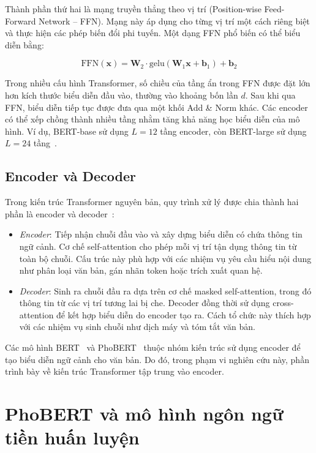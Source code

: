 Thành phần thứ hai là mạng truyền thẳng theo vị trí (Position-wise Feed-Forward Network -- FFN). Mạng này áp dụng cho từng vị trí một cách riêng biệt và thực hiện các phép biến đổi phi tuyến. Một dạng FFN phổ biến có thể biểu diễn bằng:

\[
    \mathrm{FFN}(\mathbf{x})
    =
    \mathbf{W}_2 \cdot
    \mathrm{gelu}(\mathbf{W}_1\mathbf{x}+\mathbf{b}_1)
    +\mathbf{b}_2
\]

Trong nhiều cấu hình Transformer, số chiều của tầng ẩn trong FFN được đặt lớn hơn kích thước biểu diễn đầu vào, thường vào khoảng bốn lần $d$. Sau khi qua FFN, biểu diễn tiếp tục được đưa qua một khối Add \& Norm khác. Các encoder có thể xếp chồng thành nhiều tầng nhằm tăng khả năng học biểu diễn của mô hình. Ví dụ, BERT-base sử dụng $L=12$ tầng encoder, còn BERT-large sử dụng $L=24$ tầng~\cite{devlin2019bert}.

\subsection{Encoder và Decoder}

Trong kiến trúc Transformer nguyên bản, quy trình xử lý được chia thành hai phần là encoder và decoder~\cite{vaswani2017attention}:

\begin{itemize}[leftmargin=2em]

    \item \textit{Encoder}: Tiếp nhận chuỗi đầu vào và xây dựng biểu diễn có chứa thông tin ngữ cảnh. Cơ chế self-attention cho phép mỗi vị trí tận dụng thông tin từ toàn bộ chuỗi. Cấu trúc này phù hợp với các nhiệm vụ yêu cầu hiểu nội dung như phân loại văn bản, gán nhãn token hoặc trích xuất quan hệ.

    \item \textit{Decoder}: Sinh ra chuỗi đầu ra dựa trên cơ chế masked self-attention, trong đó thông tin từ các vị trí tương lai bị che. Decoder đồng thời sử dụng cross-attention để kết hợp biểu diễn do encoder tạo ra. Cách tổ chức này thích hợp với các nhiệm vụ sinh chuỗi như dịch máy và tóm tắt văn bản.

\end{itemize}

Các mô hình BERT~\cite{devlin2019bert} và PhoBERT~\cite{phobert2020} thuộc nhóm kiến trúc sử dụng encoder để tạo biểu diễn ngữ cảnh cho văn bản. Do đó, trong phạm vi nghiên cứu này, phần trình bày về kiến trúc Transformer tập trung vào encoder.

\section{PhoBERT và mô hình ngôn ngữ tiền huấn luyện}\label{sec:phobert}

